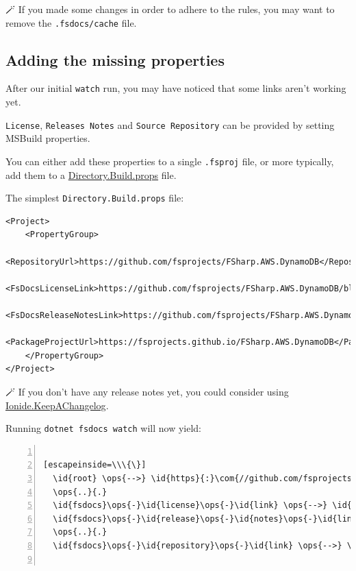 \documentclass{article}
\newcommand{\id}[1]{\textcolor{black}{#1}}
\newcommand{\com}[1]{\textcolor{officegreen}{#1}}
\newcommand{\ops}[1]{\textcolor{purple}{#1}}
\begin{document}
🪄 If you made some changes in order to adhere to the rules, you may want to remove the \texttt{.fsdocs/cache} file.
\subsection*{Adding the missing properties}



After our initial \texttt{watch} run, you may have noticed that some links aren't working yet.

\texttt{License}, \texttt{Releases Notes} and \texttt{Source Repository} can be provided by setting MSBuild properties.


You can either add these properties to a single \texttt{.fsproj} file, or more typically, add them to a \href{https://learn.microsoft.com/visualstudio/msbuild/customize-by-directory}{Directory.Build.props} file.

The simplest \texttt{Directory.Build.props} file:
\begin{lstlisting}
<Project>
    <PropertyGroup>
        <RepositoryUrl>https://github.com/fsprojects/FSharp.AWS.DynamoDB</RepositoryUrl>
        <FsDocsLicenseLink>https://github.com/fsprojects/FSharp.AWS.DynamoDB/blob/master/License.md</FsDocsLicenseLink>
        <FsDocsReleaseNotesLink>https://github.com/fsprojects/FSharp.AWS.DynamoDB/blob/master/RELEASE_NOTES.md</FsDocsReleaseNotesLink>
        <PackageProjectUrl>https://fsprojects.github.io/FSharp.AWS.DynamoDB</PackageProjectUrl>
    </PropertyGroup>
</Project>

\end{lstlisting}


🪄 If you don't have any release notes yet, you could consider using \href{https://github.com/ionide/KeepAChangelog}{Ionide.KeepAChangelog}.


Running \texttt{dotnet fsdocs watch} will now yield:
\begin{lstlisting}[numbers=left]

[escapeinside=\\\{\}]
  \id{root} \ops{-->} \id{https}{:}\com{//github.com/fsprojects/FSharp.AWS.DynamoDB/}
  \ops{..}{.}
  \id{fsdocs}\ops{-}\id{license}\ops{-}\id{link} \ops{-->} \id{https}{:}\com{//github.com/fsprojects/FSharp.AWS.DynamoDB/blob/master/License.md}
  \id{fsdocs}\ops{-}\id{release}\ops{-}\id{notes}\ops{-}\id{link} \ops{-->} \id{https}{:}\com{//github.com/fsprojects/FSharp.AWS.DynamoDB/blob/master/RELEASE\_NOTES.md}
  \ops{..}{.}
  \id{fsdocs}\ops{-}\id{repository}\ops{-}\id{link} \ops{-->} \id{https}{:}\com{//github.com/fsprojects/FSharp.AWS.DynamoDB/}


\end{lstlisting}
\end{document}
